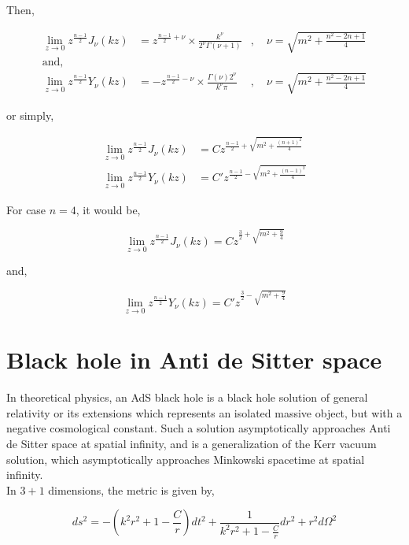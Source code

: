 Then,

\begin{align}
    \lim\limits_{z\rightarrow 0} z^{\frac{n-1}{2}}J_{\nu}(kz) &= z^{\frac{n-1}{2}+ \nu} \times \frac{k^\nu}{2^\nu\Gamma(\nu+1)}  &, \quad \nu = \sqrt{m^2 + \frac{n^2-2n+1}{4}}\\
    \text{and,} \nonumber\\
    \lim\limits_{z\rightarrow 0} z^{\frac{n-1}{2}}Y_{\nu}(kz) &= -z^{\frac{n-1}{2}- \nu} \times \frac{\Gamma(\nu)2^\nu}{k^\nu\pi}  &, \quad \nu = \sqrt{m^2 + \frac{n^2-2n+1}{4}}
\end{align}

or simply,

\begin{align}
    \lim\limits_{z\rightarrow 0} z^{\frac{n-1}{2}}J_{\nu}(kz) &= C z^{\frac{n-1}{2}+\sqrt{m^2 + \frac{(n+1)^2}{4}}} \\
    \lim\limits_{z\rightarrow 0} z^{\frac{n-1}{2}}Y_{\nu}(kz) &= C' z^{\frac{n-1}{2}-\sqrt{m^2 + \frac{(n-1)^2}{4}}}
\end{align}

For case $n=4$, it would be,

\begin{equation}
    \lim\limits_{z\rightarrow 0} z^{\frac{n-1}{2}}J_{\nu}(kz) = C z^{\frac{3}{2}+\sqrt{m^2 + \frac{9}{4}}}
\end{equation}

and,

\begin{equation}
    \lim\limits_{z\rightarrow 0} z^{\frac{n-1}{2}}Y_{\nu}(kz) = C' z^{\frac{3}{2}-\sqrt{m^2 + \frac{9}{4}}}
\end{equation}

\section{Black hole in Anti de Sitter space}

In theoretical physics, an AdS black hole is a black hole solution of general relativity  or its extensions which represents an isolated massive object, but with a negative cosmological constant. Such a solution asymptotically approaches Anti de Sitter space at spatial infinity, and is a generalization of the Kerr vacuum solution, which asymptotically approaches Minkowski spacetime at spatial infinity.\\

In $3+1$ dimensions, the metric is given by,

\begin{equation}
    ds^2 = - \left( k^2r^2 + 1 - \frac{C}{r} \right)dt^2 + \frac{1}{k^2r^2 + 1 - \frac{C}{r}}dr^2 + r^2 d\Omega^2
\end{equation}

